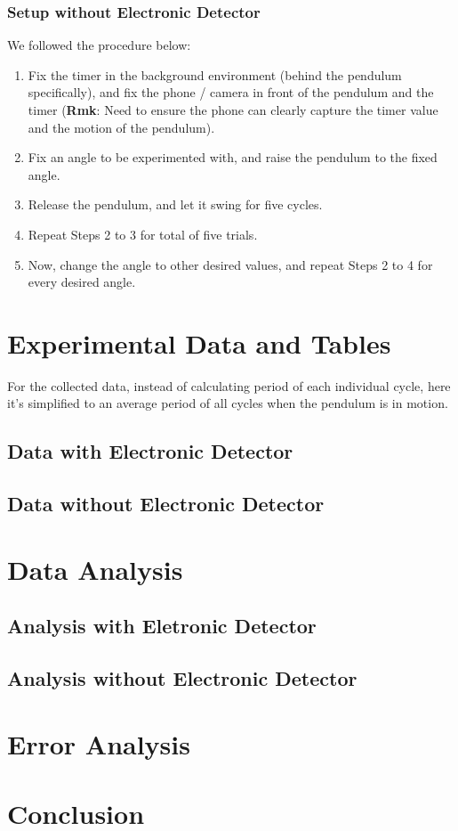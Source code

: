 \documentclass{article}
\begin{document}
\subsubsection{Setup without Electronic Detector}
We followed the procedure below:
\begin{enumerate}
    \item Fix the timer in the background environment (behind the pendulum specifically), and fix the phone / camera in front of the pendulum and the timer (\textbf{Rmk}: Need to ensure the phone can clearly capture the timer value and the motion of the pendulum).
    \item Fix an angle to be experimented with, and raise the pendulum to the fixed angle.
    \item Release the pendulum, and let it swing for five cycles.
    \item Repeat Steps 2 to 3 for total of five trials.
    \item Now, change the angle to other desired values, and repeat Steps 2 to 4 for every desired angle.
\end{enumerate}

\newpage

\section{Experimental Data and Tables}
For the collected data, instead of calculating period of each individual cycle, here it's simplified to an average period of all cycles when the pendulum is in motion.
\subsection{Data with Electronic Detector}

\subsection{Data without Electronic Detector}

\section{Data Analysis}
\subsection{Analysis with Eletronic Detector}

\subsection{Analysis without Electronic Detector}

\section{Error Analysis}

\section{Conclusion}
\end{document}
